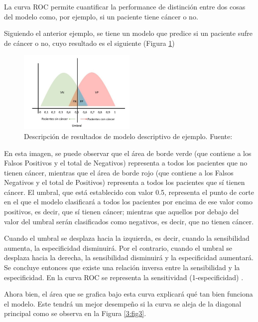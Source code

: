 \begin{itemize}
	La curva ROC permite cuantificar la performance de distinción entre dos cosas del modelo como, por ejemplo, si un paciente tiene cáncer o no.
	
	Siguiendo el anterior ejemplo, se tiene un modelo que predice si un paciente sufre de cáncer o no, cuyo resultado es el siguiente (Figura \ref{3:fig2})
	
	\begin{figure}[htbp]
		\begin{center}
			\includegraphics[width=0.50\textwidth]{3/figures/auc_example.jpg}
			\caption{Descripción de resultados de modelo descriptivo de ejemplo. Fuente: \cite{gl_gonzalez2019auc}}
			\label{3:fig2}
		\end{center}
	\end{figure}
	
	En esta imagen, se puede observar que el área de borde verde (que contiene a los Falsos Positivos y el total de Negativos) representa a todos los pacientes que no tienen cáncer, mientras que el área de borde rojo (que contiene a los Falsos Negativos y el total de Positivos) representa a todos los pacientes que sí tienen cáncer. El umbral, que está establecido con valor 0.5, representa el punto de corte en el que el modelo clasificará a todos los pacientes por encima de ese valor como positivos, es decir, que sí tienen cáncer; mientras que aquellos por debajo del valor del umbral serán clasificados como negativos, es decir, que no tienen cáncer.
	
	Cuando el umbral se desplaza hacia la izquierda, es decir, cuando la sensibilidad aumenta, la especificidad disminuirá. Por el contrario, cuando el umbral se desplaza hacia la derecha, la sensibilidad disminuirá y la especificidad aumentará. Se concluye entonces que existe una relación inversa entre la sensibilidad y la especificidad. En la curva ROC se representa la sensitividad (1-especificidad) \parencite{gl_gonzalez2019auc}.
	
	Ahora bien, el área que se grafica bajo esta curva explicará qué tan bien funciona el modelo. Este tendrá un mejor desempeño si la curva se aleja de la diagonal principal como se observa en la Figura \ref{3:fig3}.
	

\end{itemize}
